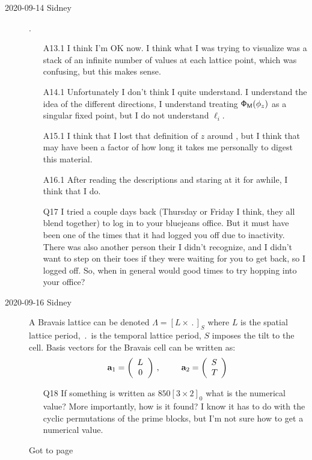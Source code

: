 \begin{description}
\item[2020-09-14 Sidney].
\begin{itemize}
	\item[A13.1]
I think I'm OK now. I think what I was trying to visualize was a stack of an infinite number of values at each lattice point, which was confusing, but this makes sense.
	\item[A14.1]
Unfortunately I don't think I quite understand. I understand the idea of the different directions, I understand treating
$\mathsf{\Phi}_{\mathsf{M}}(\phi_z)$ as a singular fixed point, but I do not understand $\ell_i$.
	\item[A15.1]
I think that I lost that definition of $\textit{z}$ around , but I think that may have been a factor of how long it takes me personally to digest this material.
	\item[A16.1]
After reading the descriptions and staring at it for awhile, I think that I do.
	\item[Q17]
I tried a couple days back (Thursday or Friday I think, they all blend together) to log in to your bluejeans office. But it must have been one of the times that it had logged you off due to inactivity. There was also another person their I didn't recognize, and I didn't want to step on their toes if they were waiting for you to get back, so I logged off. So, when in general would good times to try hopping into your office?
\end{itemize}

\item[2020-09-16 Sidney]
A Bravais lattice can be denoted $\Lambda=\left[L\times\period{}\right]_S$ where $L$
is the spatial lattice period,  $\period{}$ is the temporal lattice period, $S$
imposes the tilt to the cell. Basis vectors for the Bravais cell can be
written as:
\[
\mathbf{a}_1=\left(\begin{array}{c}
  {\ensuremath{L_{}}}\\
  0{}
  \end{array}\right)
  \,,\hspace*{25pt}
\mathbf{a}_2=\left(\begin{array}{c}
  {\ensuremath{S_{}}}\\
  {T_{}}
  \end{array}\right)
  \,
\]

\begin{itemize}
	\item[Q18]
If something is written as $850[3\times2]_0$ what is the numerical value? More importantly, how is it found? I know it has to do with the cyclic permutations of the prime blocks, but I'm not sure how to get a numerical value.
\end{itemize}
Got to page 


\end{description}
